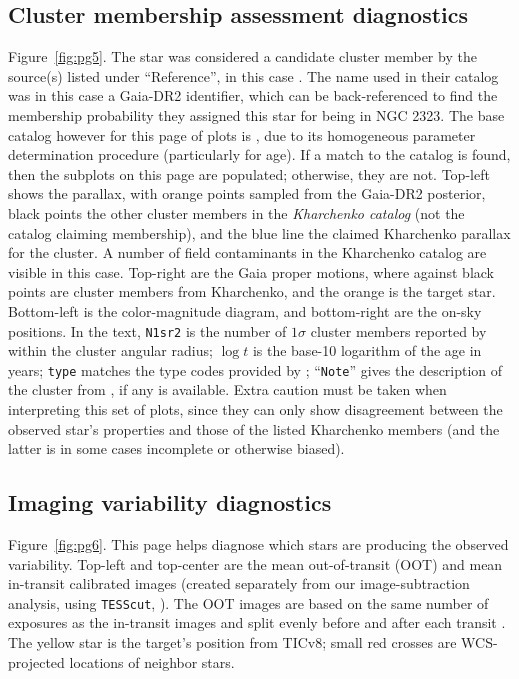 \documentclass[12pt,twocolumn,tighten]{aastex62}
\begin{document}
\subsection{Cluster membership assessment diagnostics}
\label{sec:pg5}

Figure~\ref{fig:pg5}.
The star was considered a candidate cluster member by the source(s)
listed under ``Reference'', in this case
\citet{cantat-gaudin_gaia_2018}.  The name used in their catalog was
in this case a Gaia-DR2 identifier, which can be
back-referenced to find the membership probability they assigned this
star for being in NGC 2323.  The base catalog however for this page
of plots is \citet{Kharchenko_et_al_2013}, due to its homogeneous
parameter determination procedure (particularly for age).  If a match to
the \citet{Kharchenko_et_al_2013} catalog is found, then the subplots on
this page are populated; otherwise, they are not.  Top-left shows the
parallax, with orange points sampled from the Gaia-DR2 posterior, black
points the other cluster members in the {\it Kharchenko catalog} (not
the catalog claiming membership), and the blue line the claimed
Kharchenko parallax for the cluster.  A number of field contaminants in
the Kharchenko catalog are visible in this case.  Top-right are the Gaia
proper motions, where against black points are cluster members from
Kharchenko, and the orange is the target star.  Bottom-left is the
color-magnitude diagram, and bottom-right are the on-sky positions.  In
the text, \texttt{N1sr2} is the number of $1\sigma$ cluster members
reported by \citet{Kharchenko_et_al_2013} within the cluster angular
radius; $\log t$ is the base-10 logarithm of the age in years;
\texttt{type} matches the type codes provided by
\citet{Kharchenko_et_al_2013}; ``\texttt{Note}'' gives the description
of the cluster from \citet{Kharchenko_et_al_2013}, if any is available.
Extra caution must be taken when interpreting this set of plots, since
they can only show disagreement between the observed star's properties
and those of the listed Kharchenko members (and the latter is in some cases
incomplete or otherwise biased).

\subsection{Imaging variability diagnostics}
\label{sec:pg6}

Figure~\ref{fig:pg6}.
This page helps diagnose which stars are producing the observed
variability.  Top-left and top-center are the mean out-of-transit
(OOT) and mean in-transit calibrated images (created separately from our
image-subtraction analysis, using \texttt{TESScut},
\citealt{brasseur_astrocut_2019}).  The OOT images are based on the same
number of exposures as the in-transit images and split evenly before
and after each transit
\citep[following][]{bryson_identification_2013,kostov_l9859_2019}.
The yellow star is the target's position from TICv8; 
small red crosses are WCS-projected locations of neighbor stars.
\end{document}
